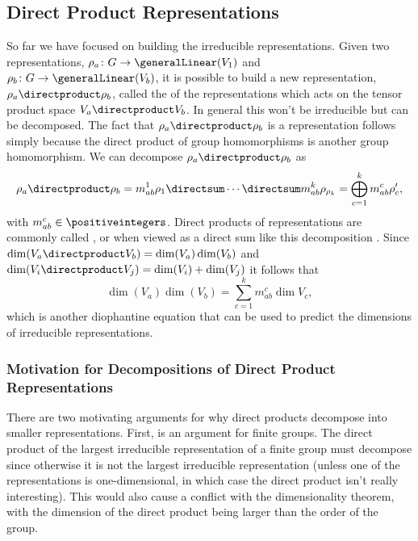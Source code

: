 \subsection{Direct Product Representations}
So far we have focused on building the irreducible representations.
Given two representations, \(\rho_a \colon G \to \generalLinear(V_1)\) and
\(\rho_b \colon G \to \generalLinear(V_b)\), it is possible to build a new
representation, \(\rho_a \directproduct \rho_b\), called the  of the representations which acts on the tensor product space \(V_a
\directproduct V_b\).
In general this won't be irreducible but can be decomposed.
The fact that \(\rho_a \directproduct \rho_b\) is a representation follows
simply because the direct product of group homomorphisms is another group
homomorphism.
We can decompose \(\rho_a \directproduct \rho_b\) as
\begin{equation}
    \rho_a \directproduct \rho_b = m_{ab}^{1} \rho_{1} \directsum \dotsb
    \directsum m_{ab}^{k} \rho_{\rho_k} = \bigoplus_{c = 1}^{k} m_{ab}^{c} \rho_c',
\end{equation}
with \(m_{ab}^c \in \positiveintegers\).
Direct products of representations are commonly called , or when viewed as a direct sum like this decomposition
.
Since \(\dim(V_a \directproduct V_b) = \dim(V_a) \dim(V_b)\) and \(\dim(V_i
\directproduct V_j) = \dim(V_i) + \dim(V_j)\) it follows that
\begin{equation}
    \dim(V_a)\dim(V_b) = \sum_{c = 1}^{k} m_{ab}^c \dim V_c,
\end{equation}
which is another diophantine equation that can be used to predict the
dimensions of irreducible representations.

\subsubsection{Motivation for Decompositions of Direct Product
    Representations}
There are two motivating arguments for why direct products decompose into
smaller representations.
First, is an argument for finite groups.
The direct product of the largest irreducible representation of a finite
group must decompose since otherwise it is not the largest irreducible
representation (unless one of the representations is one-dimensional, in which
case the direct product isn't really interesting).
This would also cause a conflict with the dimensionality theorem, with the
dimension of the direct product being larger than the order of the group.

